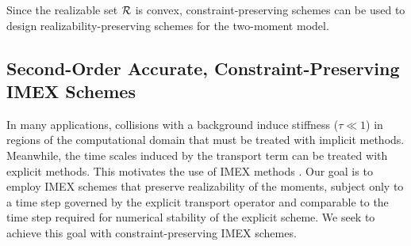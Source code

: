 Since the realizable set $\mathcal{R}$ is convex, constraint-preserving schemes can be used to design realizability-preserving schemes for the two-moment model.  

\subsection{Second-Order Accurate, Constraint-Preserving IMEX Schemes}

In many applications, collisions with a background induce stiffness ($\tau\ll1$) in regions of the computational domain that must be treated with implicit methods.  
Meanwhile, the time scales induced by the transport term can be treated with explicit methods.  
This motivates the use of IMEX methods \cite{ascher_etal_1997,pareschiRusso_2005}.  
Our goal is to employ IMEX schemes that preserve realizability of the moments, subject only to a time step governed by the explicit transport operator and comparable to the time step required for numerical stability of the explicit scheme.  
We seek to achieve this goal with constraint-preserving IMEX schemes.  

